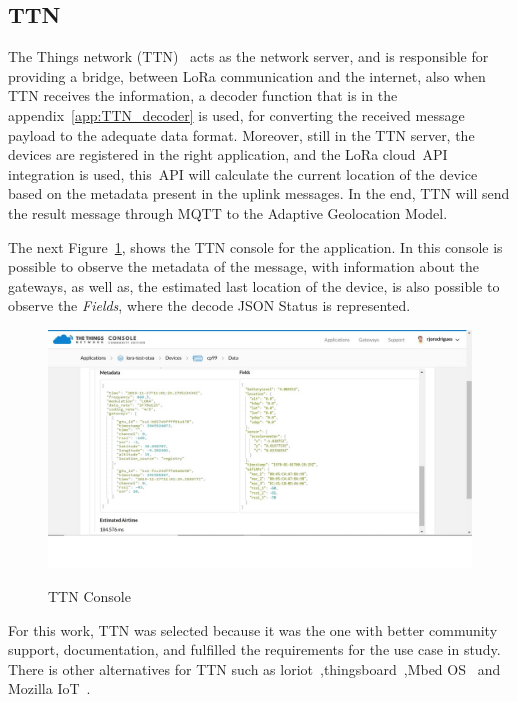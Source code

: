 \subsection{TTN} %
\label{sec:TTN}
The Things network (TTN)~\cite{TTN} acts as the network server, and is responsible for providing a bridge, between LoRa communication and the internet, also when TTN receives the information, a decoder function that is in the appendix~\ref{app:TTN_decoder} is used, for converting the received message payload to the adequate data format.
Moreover, still in the TTN server, the devices are registered in the right application, and the LoRa cloud~\gls{API} integration is used, this~\gls{API} will calculate the current location of the device based on the metadata present in the uplink messages. In the end, TTN will send the result message through MQTT to the Adaptive Geolocation Model.

The next Figure~\ref{fig:TTN_Console}, shows the TTN console for the application. In this console is possible to observe the metadata of the message,  with information about the gateways, as well as, the estimated last location of the device, is also possible to observe the \emph{Fields}, where the decode JSON Status is represented.

\begin{figure}[htbp]
  \centering
  
    {\includegraphics[width=\linewidth]{Chapters/Figures/ttn2.JPG}}
 
  \caption{TTN Console}
  \label{fig:TTN_Console}
\end{figure}

For this work, TTN was selected because it was the one with better community support, documentation, and fulfilled the requirements for the use case in study. There is other alternatives for TTN such as  loriot~\cite{Loriot},thingsboard~\cite{ThingsBoard},Mbed OS~\cite{Mbed} and Mozilla IoT~\cite{Mozilla}. 


